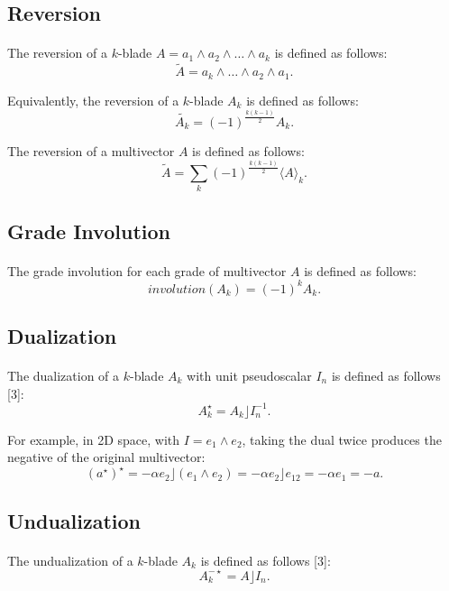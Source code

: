 \documentclass{article}
\begin{document}
\subsection{\textbf{Reversion}}

\paragraph{}The reversion of a $k$-blade $A = a_1 \wedge a_2 \wedge \ldots \wedge a_k$ is defined as follows:
$$\tilde{A} = a_k \wedge \ldots \wedge a_2 \wedge a_1.$$

Equivalently, the reversion of a $k$-blade $A_k$ is defined as follows:
$$\tilde{A_k} = (-1)^{\frac{k(k-1)}{2}} A_k.$$

The reversion of a multivector $A$ is defined as follows:
$$\tilde{A} = \sum_{k}^{} (-1)^{\frac{k(k-1)}{2}} \langle A \rangle_k .$$

\subsection{\textbf{Grade Involution}}

\paragraph{}The grade involution for each grade of multivector $A$ is defined as follows:
$$involution(A_k) = (-1)^{k} A_k .$$

\subsection{\textbf{Dualization}}

\paragraph{}The dualization of a $k$-blade $A_k$ with unit pseudoscalar $I_n$ is defined as follows [3]:
$$A_k^{\star} = {A_k} \rfloor I_n^{-1}.$$

For example, in 2D space, with $I = e_1 \wedge e_2$, taking the dual twice produces the negative of the original multivector:
$$(a^\star)^\star = -\alpha e_2 \rfloor (e_1 \wedge e_2) = -\alpha e_2 \rfloor e_{12} = -\alpha e_1 = -a.$$

\subsection{\textbf{Undualization}}

\paragraph{}The undualization of a $k$-blade $A_k$ is defined as follows [3]:
$$A_k^{-\star} = A \rfloor I_n.$$
\end{document}
